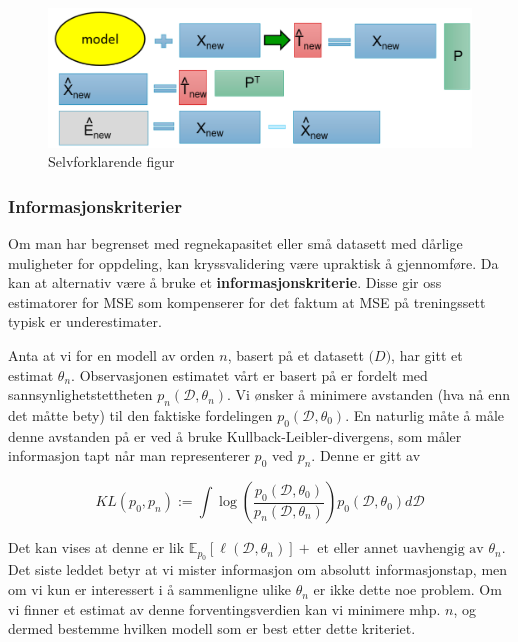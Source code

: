 \begin{figure}[h]
	\centering
	\includegraphics[width=\textwidth]{figurer/pca_kryssvalidering}
	\caption{Selvforklarende figur}
	\label{fig:pca_kryssvalidering}
\end{figure}

\subsubsection{Informasjonskriterier}
Om man har begrenset med regnekapasitet eller små datasett med dårlige muligheter for oppdeling, kan kryssvalidering være upraktisk å gjennomføre. Da kan at alternativ være å bruke et \textbf{informasjonskriterie}. Disse gir oss estimatorer for MSE som kompenserer for det faktum at MSE på treningssett typisk er underestimater.

Anta at vi for en modell av orden $n$, basert på et datasett $\mathcal(D)$, har gitt et estimat $\theta_n$. Observasjonen estimatet vårt er basert på er fordelt med sannsynlighetstettheten $p_n(\mathcal{D}, \theta_n)$. Vi ønsker å minimere avstanden (hva nå enn det måtte bety) til den faktiske fordelingen $p_0(\mathcal{D}, \theta_0)$. En naturlig måte å måle denne avstanden på er ved å bruke Kullback-Leibler-divergens, som måler informasjon tapt når man representerer $p_0$ ved $p_n$. Denne er gitt av

\begin{equation}
	K L\left(p_{0}, p_{n}\right):=\int \log \left(\frac{p_{0}\left({\mathcal{D}}, \theta_{0}\right)}{p_{n}\left({\mathcal{D}}, \theta_{n}\right)}\right) p_{0}\left({\mathcal{D}}, \theta_{0}\right) d {\mathcal{D}}
\end{equation}

Det kan vises at denne er lik $\mathbb{E}_{p_0} [\ell (\mathcal{D}, \theta_n)] + \textrm{ et eller annet uavhengig av } \theta_n$. Det siste leddet betyr at vi mister informasjon om absolutt informasjonstap, men om vi kun er interessert i å sammenligne ulike $\theta_n$ er ikke dette noe problem. Om vi finner et estimat av denne forventingsverdien kan vi minimere mhp. $n$, og dermed bestemme hvilken modell som er best etter dette kriteriet.

